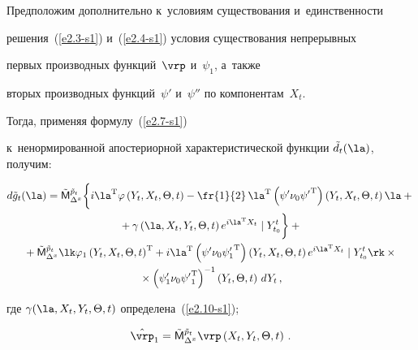  Предположим дополнительно к~условиям существования и~единственности 

 решения~(\ref{e2.3-s1}) и~(\ref{e2.4-s1})  условия существования непрерывных 

 первых производных функций~$\vrp$ и~$\psi_1$, а~так\-же 

 вторых производных функций~$\psi'$ и~$\psi''$ по компонентам~$X_t$. 

 Тогда, применяя формулу~(\ref{e2.7-s1}) 

 к~ненормированной апостериорной характеристической функции $\tilde d_t(\la)$, получим:

 \begin{multline}

d\tilde g_t (\la) =\tilde{\sf M}_{\Delta^x}^{\tilde p_t} \biggl\{ 

i\la^{\mathrm{T}}  \varphi\left(Y_t,X_t,\Theta, t\right) -\fr{1}{2}\, \la^{\mathrm{T}} 

\left(\psi'\nu_0 {\psi'}^{\mathrm{T}}\right) \left(Y_t,X_t,\Theta, t\right)\la

    +{}\\

{}+ \gamma \left(\la, X_t, Y_t, \Theta, t\right) e^{i\la^{\mathrm{T}}

    X_t} \mid Y_{t_0}^t\biggr\} +{}\\

{}+ \tilde{\sf M}_{\Delta^x}^{\tilde p_t}  \lk \varphi_1

    \left(Y_t,X_t,\Theta, t\right)^{\mathrm{T}} +

    i\la^{\mathrm{T}} \left(\psi'\nu_0 {\psi_1'}^{\mathrm{T}}\right) \left(Y_t,X_t,\Theta, t\right)

   e^{i\la^{\mathrm{T}} X_t}\mid Y_{t_0}^t \rk\times{}\\

{}\times \left(\psi_1'\nu_0{\psi'}_1^{\mathrm{T}}\right)^{-1} \left(Y_t,\Theta,t\right)\, dY_t\,,

\label{e2.12-s1}

\end{multline}

где $\gamma (\la, X_t, Y_t, \Theta, t)$ определена~(\ref{e2.10-s1});

\begin{equation*}

    \hat\vrp_1 = \tilde{\sf M}_{\Delta^x}^{\tilde p_t} \vrp \left(X_t, Y_t, \Theta, t\right)\,.


    \end{equation*}

